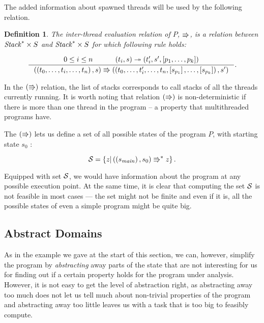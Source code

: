 \documentclass[..thesis.tex]{subfiles}
\newtheorem{defin}{Definition}[section]
\begin{document}

The added information about spawned threads will be used by the following relation.

\begin{defin}

  The inter-thread evaluation relation of $P$, $\Rrightarrow$,
  is a relation between $\mathit{Stack}^\ast \times S$ and  $\mathit{Stack}^\ast \times S$  for which following rule holds:   

  \begin{equation*}
    \inference{ 0 \leq i \leq n  \separ \lp t_i , s \rp \intrathread \lp t'_i, s', \lbk p_1, \ldots, p_k \rbk \rp}{ \lp \lp t_0, \ldots,t_i, \ldots, t_n \rp, s \rp \interthread  \lp \lp t_0, \ldots,t'_i, \ldots, t_n, \lbk s_{p_1} \rbk, \ldots, \lbk s_{p_k} \rbk  \rp , s' \rp} \text{.}
  \end{equation*}
\end{defin}

In the $\left( \Rrightarrow \right)$ relation, the list of stacks corresponds to call stacks of all the threads currently running.
It is worth noting that relation $\left( \Rrightarrow \right)$ is non-deterministic if there is more than one thread in the program -- a property that multithreaded programs have.

The $\left( \Rrightarrow \right)$ lets us define a set of all possible states of the program $P$, with starting state $s_0$ :

\begin{equation*}
\mathcal{S} = \left\lbrace  z | \left( \left( s_{\mathit{main}} \right), s_0 \right) \Rrightarrow^{\ast} z \right\rbrace \text{.}
\end{equation*}



Equipped with set $\mathcal{S}$, we would have information about the program at any possible execution point. At the same time,
 it is clear that computing the set $\mathcal{S}$ is not feasible in most cases --- the set might not be finite and even if it is,
 all the possible states of even a simple program might be quite big.

\subsection{Abstract Domains}

As in the example we gave at the start of this section, we can, however, simplify the program by \textit{abstracting} away parts
of the state that are not interesting for us for finding out if a certain property holds for the program under analysis. 
However, it is not easy to get the level of abstraction right, as abstracting away too much does not let us tell much about non-trivial properties
of the program and abstracting away too little leaves us with a task that is too big to feasibly compute.
\end{document}
